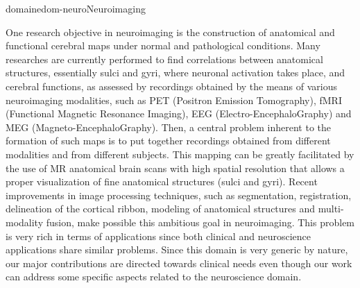 \documentclass{ra2018}
\begin{document}




\begin{module}{domaine}{dom-neuro}{Neuroimaging}

One research objective in neuroimaging is the construction of anatomical and functional cerebral maps under normal and pathological conditions. Many researches are currently performed to find correlations between anatomical structures, essentially sulci and gyri, where neuronal activation takes place, and cerebral functions, as assessed by recordings obtained by the means of various neuroimaging modalities, such as PET (Positron Emission Tomography), fMRI (Functional Magnetic Resonance Imaging), EEG (Electro-EncephaloGraphy) and MEG (Magneto-EncephaloGraphy). Then, a central problem inherent to the formation of such maps is to put together recordings obtained from different modalities and from different subjects. This mapping can be greatly facilitated by the use of MR anatomical brain scans with high spatial resolution that allows a proper visualization of fine anatomical structures (sulci and gyri). Recent improvements in image processing techniques, such as segmentation, registration, delineation of the cortical ribbon, modeling of anatomical structures and multi-modality fusion, make possible this ambitious goal in neuroimaging. This problem is very rich in terms of applications since both clinical and neuroscience applications share similar problems. Since this domain is very generic by nature, our major contributions are directed towards clinical needs even though our work can address some specific aspects related to the neuroscience domain. 

\end{module}
\end{document}
